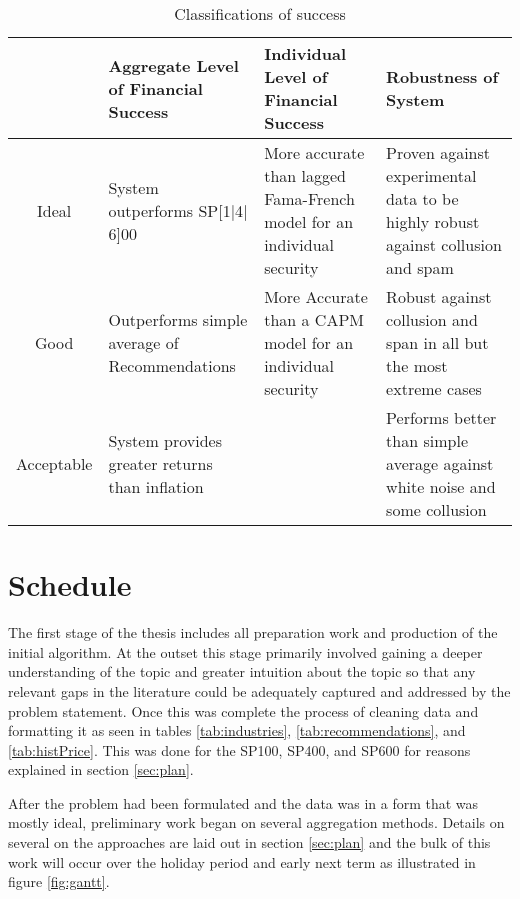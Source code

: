 \begin{table}[p]
    \centering
    \begin{tabularx}{0.95\textwidth}{@{\extracolsep{\fill}}cXXX}
        \toprule\toprule
         & Aggregate Level of Financial Success  &Individual Level of Financial Success & Robustness of System \\\midrule
        Ideal & System outperforms SP[1$|$4$|$6]00 & More accurate than lagged Fama-French model for an individual security & Proven against experimental data to be highly robust against collusion and spam\\
        \addlinespace
        Good & Outperforms simple average of Recommendations & More Accurate than a CAPM model for an individual security & Robust against collusion and span in all but the most extreme cases\\
        \addlinespace
        Acceptable & System provides greater returns than inflation && Performs better than simple average against white noise and some collusion \\ \bottomrule
    \end{tabularx}
    \caption[Classifications of success]{Classifications of success  }
    \label{tab:success}
\end{table}


\section{Schedule}\label{sec:schedule}
The first stage of the thesis includes all preparation work and production of the initial algorithm. At the outset this stage primarily involved gaining a deeper understanding of the topic and greater intuition about the topic so that any relevant gaps in the literature could be adequately captured and addressed by the problem statement. Once this was complete the process of cleaning data and formatting it as seen in tables \ref{tab:industries}, \ref{tab:recommendations}, and \ref{tab:histPrice}. This was done for the SP100, SP400, and SP600 for reasons explained in section \ref{sec:plan}. 

After the problem had been formulated and the data was in a form that was mostly ideal, preliminary work began on several aggregation methods. Details on several on the approaches are laid out in section \ref{sec:plan} and the bulk of this work will occur over the holiday period and early next term as illustrated in figure \ref{fig:gantt}.

